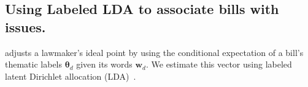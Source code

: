 



\subsection{Using Labeled LDA to associate bills with issues.}
\label{sec:lda}

 adjusts a lawmaker's ideal
point by using the conditional expectation of a bill's thematic labels
$\bm \theta_d$ given its words $\bm w_d$.  We estimate this vector
using labeled latent Dirichlet allocation (LDA)~\citep{ramage:2009}.

